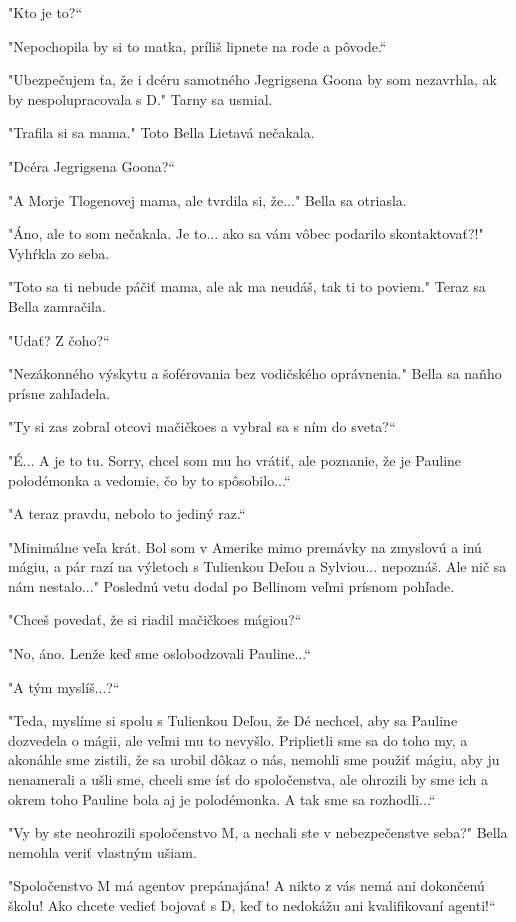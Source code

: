 \documentclass{book}
\begin{document}
"$ $Kto je to?“

"$ $Nepochopila by si to matka, príliš lipnete na rode a pôvode.“

"$ $Ubezpečujem ťa, že i dcéru samotného Jegrigsena Goona by som nezavrhla, ak by nespolupracovala s D."$ $ Tarny sa usmial.

"$ $Trafila si sa mama."$ $ Toto Bella Lietavá nečakala.

"$ $Dcéra Jegrigsena Goona?“

"$ $A Morje Tlogenovej mama, ale tvrdila si, že..."$ $ Bella sa otriasla.

"$ $Áno, ale to som nečakala. Je to... ako sa vám vôbec podarilo skontaktovať?!"$ $ Vyhŕkla zo seba.

"$ $Toto sa ti nebude páčiť mama, ale ak ma neudáš, tak ti to poviem."$ $ Teraz sa Bella zamračila.

"$ $Udať? Z čoho?“

"$ $Nezákonného výskytu a šoférovania bez vodičského oprávnenia."$ $ Bella sa naňho prísne zahľadela.

"$ $Ty si zas zobral otcovi mačičkoes a vybral sa s ním do sveta?“

"$ $É... A je to tu. Sorry, chcel som mu ho vrátiť, ale poznanie, že je Pauline polodémonka a vedomie, čo by to spôsobilo...“

"$ $A teraz pravdu, nebolo to jediný raz.“

"$ $Minimálne veľa krát. Bol som v Amerike mimo premávky na zmyslovú a inú mágiu, a pár razí na výletoch s Tulienkou Deľou a Sylviou... nepoznáš. Ale nič sa nám nestalo..."$ $ Poslednú vetu dodal po Bellinom veľmi prísnom pohľade.

"$ $Chceš povedať, že si riadil mačičkoes mágiou?“

"$ $No, áno. Lenže keď sme oslobodzovali Pauline...“

"$ $A tým myslíš...?“

"$ $Teda, myslíme si spolu s Tulienkou Deľou, že Dé nechcel, aby sa Pauline dozvedela o mágii, ale veľmi mu to nevyšlo. Priplietli sme sa do toho my, a akonáhle sme zistili, že sa urobil dôkaz o nás, nemohli sme použiť mágiu, aby ju nenamerali a ušli sme, chceli sme ísť do spoločenstva, ale ohrozili by sme ich a okrem toho Pauline bola aj je polodémonka. A tak sme sa rozhodli...“

"$ $Vy by ste neohrozili spoločenstvo M, a nechali ste v nebezpečenstve seba?"$ $ Bella nemohla veriť vlastným ušiam.

"$ $Spoločenstvo M má agentov prepánajána! A nikto z vás nemá ani dokončenú školu! Ako chcete vedieť bojovať s D, keď to nedokážu ani kvalifikovaní agenti!“
\end{document}
